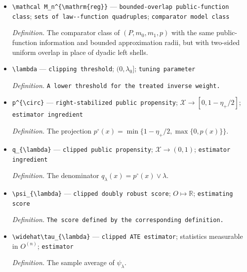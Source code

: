 \documentclass{article}
\begin{document}
\begin{itemize}
  \par\smallskip\noindent\emph{Definition.} The class of \((P,m_0,m_1,p)\) at sample size \(n\) defined by the corresponding definition.
  \item \texttt{\textbackslash{}\allowbreak{}mathcal M\_\allowbreak{}n\textasciicircum{}\{\textbackslash{}\allowbreak{}mathrm\{reg\}\allowbreak{}\}\allowbreak{}} --- \texttt{bounded-\allowbreak{}overlap public-\allowbreak{}function class}; \texttt{sets of law-\allowbreak{}-\allowbreak{}function quadruples}; \texttt{comparator model class}
  \par\smallskip\noindent\emph{Definition.} The comparator class of \((P,m_0,m_1,p)\) with the same public-function information and bounded approximation radii, but with two-sided uniform overlap in place of dyadic left shells.
  \item \texttt{\textbackslash{}\allowbreak{}lambda} --- \texttt{clipping threshold}; \((0,\lambda_0]\); \texttt{tuning parameter}
  \par\smallskip\noindent\emph{Definition.} \texttt{A lower threshold for the treated inverse weight.}
  \item \texttt{p\textasciicircum{}\{\textbackslash{}\allowbreak{}circ\}\allowbreak{}} --- \texttt{right-\allowbreak{}stabilized public propensity}; \(\mathcal X\to[0,1-\eta_+/2]\); \texttt{estimator ingredient}
  \par\smallskip\noindent\emph{Definition.} The projection \(p^{\circ}(x)=\min\{1-\eta_+/2,\max\{0,p(x)\}\}\).
  \item \texttt{q\_\allowbreak{}\{\textbackslash{}\allowbreak{}lambda\}\allowbreak{}} --- \texttt{clipped public propensity}; \(\mathcal X\to(0,1)\); \texttt{estimator ingredient}
  \par\smallskip\noindent\emph{Definition.} The denominator \(q_{\lambda}(x)=p^{\circ}(x)\vee\lambda\).
  \item \texttt{\textbackslash{}\allowbreak{}psi\_\allowbreak{}\{\textbackslash{}\allowbreak{}lambda\}\allowbreak{}} --- \texttt{clipped doubly robust score}; \(O\mapsto\mathbb R\); \texttt{estimating score}
  \par\smallskip\noindent\emph{Definition.} \texttt{The score defined by the corresponding definition.}
  \item \texttt{\textbackslash{}\allowbreak{}widehat\textbackslash{}\allowbreak{}tau\_\allowbreak{}\{\textbackslash{}\allowbreak{}lambda\}\allowbreak{}} --- \texttt{clipped ATE estimator}; statistics measurable in \(O^{(n)}\); \texttt{estimator}
  \par\smallskip\noindent\emph{Definition.} The sample average of \(\psi_{\lambda}\).

\end{itemize}
\end{document}
